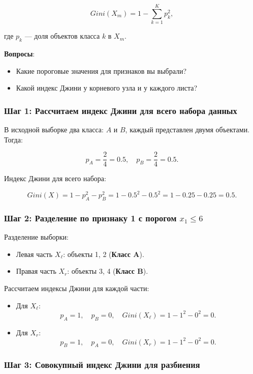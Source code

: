 \begin{itemize}
\[
Gini(X_m) = 1 - \sum_{k=1}^K p_k^2,
\]

где $p_k$ — доля объектов класса $k$ в $X_m$.

\textbf{Вопросы}:
\begin{itemize}
    \item Какие пороговые значения для признаков вы выбрали?
    \item Какой индекс Джини у корневого узла и у каждого листа?
\end{itemize}

\begin{solution}
\subsubsection*{Шаг 1: Рассчитаем индекс Джини для всего набора данных}
    В исходной выборке два класса: $A$ и $B$, каждый представлен двумя объектами. Тогда:

\[
p_A = \frac{2}{4} = 0.5, \quad p_B = \frac{2}{4} = 0.5.
\]

Индекс Джини для всего набора:

\[
Gini(X) = 1 - p_A^2 - p_B^2 = 1 - 0.5^2 - 0.5^2 = 1 - 0.25 - 0.25 = 0.5.
\]

\subsubsection*{Шаг 2: Разделение по признаку 1 с порогом $x_1 \leq 6$}

Разделение выборки:
\begin{itemize}
    \item Левая часть $X_\ell$: объекты 1, 2 (\textbf{Класс A}).
    \item Правая часть $X_r$: объекты 3, 4 (\textbf{Класс B}).
\end{itemize}

\noindent Рассчитаем индексы Джини для каждой части:
\begin{itemize}
    \item Для $X_\ell$:
    \[
    p_A = 1, \quad p_B = 0, \quad Gini(X_\ell) = 1 - 1^2 - 0^2 = 0.
    \]

    \item Для $X_r$:
    \[
    p_B = 1, \quad p_A = 0, \quad Gini(X_r) = 1 - 1^2 - 0^2 = 0.
    \]
\end{itemize}

\subsubsection*{Шаг 3: Совокупный индекс Джини для разбиения}


\end{solution}
\end{itemize}
